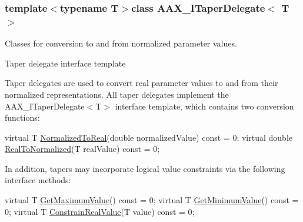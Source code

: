 \subsubsection*{template$<$typename T$>$class A\+A\+X\+\_\+\+I\+Taper\+Delegate$<$ T $>$}

Classes for conversion to and from normalized parameter values. 

Taper delegate interface template

Taper delegates are used to convert real parameter values to and from their normalized representations. All taper delegates implement the A\+A\+X\+\_\+\+I\+Taper\+Delegate$<$\+T$>$ interface template, which contains two conversion functions\+:


\begin{DoxyCode}
\textcolor{keyword}{virtual} T       \hyperlink{a00114_a0aea0765b42855205bfab84673a2de33}{NormalizedToReal}(\textcolor{keywordtype}{double} normalizedValue) \textcolor{keyword}{const} = 0;
\textcolor{keyword}{virtual} \textcolor{keywordtype}{double}  \hyperlink{a00114_ab017fe7e1c1dcf6191f8b4e8b09f8add}{RealToNormalized}(T realValue) \textcolor{keyword}{const} = 0;    
\end{DoxyCode}


In addition, tapers may incorporate logical value constraints via the following interface methods\+:


\begin{DoxyCode}
\textcolor{keyword}{virtual} T       \hyperlink{a00114_a9b14f7d73d614b6c012ed03fadb9f0eb}{GetMaximumValue}()  \textcolor{keyword}{const} = 0;
\textcolor{keyword}{virtual} T       \hyperlink{a00114_ac51bda25adc6f4ce320c0dd41fa332c7}{GetMinimumValue}() \textcolor{keyword}{const} = 0;
\textcolor{keyword}{virtual} T       \hyperlink{a00114_a1de7acdc2b3e114b6686bf845c2465f1}{ConstrainRealValue}(T value)   \textcolor{keyword}{const} = 0;
\end{DoxyCode}


